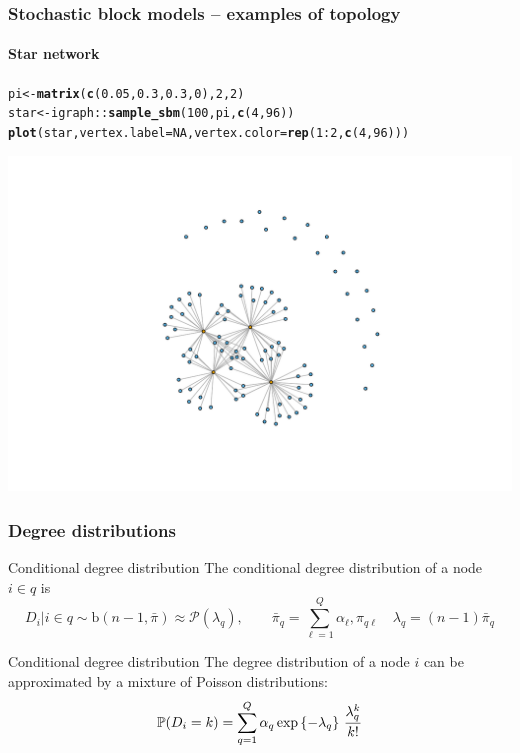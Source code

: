 \documentclass{beamer}\usepackage[]{graphicx}\usepackage[]{color}
\makeatletter
\newcommand{\hlnum}[1]{\textcolor[rgb]{0.686,0.059,0.569}{#1}}%
\newcommand{\hlopt}[1]{\textcolor[rgb]{0,0,0}{#1}}%
\newcommand{\hlstd}[1]{\textcolor[rgb]{0.345,0.345,0.345}{#1}}%
\newcommand{\hlkwb}[1]{\textcolor[rgb]{0.69,0.353,0.396}{#1}}%
\newcommand{\hlkwc}[1]{\textcolor[rgb]{0.333,0.667,0.333}{#1}}%
\newcommand{\hlkwd}[1]{\textcolor[rgb]{0.737,0.353,0.396}{\textbf{#1}}}%
\newenvironment{kframe}{%
 \def\at@end@of@kframe{}%
 \ifinner\ifhmode%
  \def\at@end@of@kframe{\end{minipage}}%
  \begin{minipage}{\columnwidth}%
 \fi\fi%
 \def\FrameCommand##1{\hskip\@totalleftmargin \hskip-\fboxsep
 \colorbox{shadecolor}{##1}\hskip-\fboxsep
     \hskip-\linewidth \hskip-\@totalleftmargin \hskip\columnwidth}%
 \MakeFramed {\advance\hsize-\width
   \@totalleftmargin\z@ \linewidth\hsize
   \@setminipage}}%
 {\par\unskip\endMakeFramed%
 \at@end@of@kframe}
\newenvironment{knitrout}{}{} %
\makeatother
\begin{document}
\begin{frame}[fragile]
  \frametitle{Stochastic block models -- examples of topology}
  \framesubtitle{Star network}

\begin{knitrout}\scriptsize
{}\color{fgcolor}\begin{kframe}
\begin{alltt}
\hlstd{pi} \hlkwb{<-} \hlkwd{matrix}\hlstd{(}\hlkwd{c}\hlstd{(}\hlnum{0.05}\hlstd{,}\hlnum{0.3}\hlstd{,}\hlnum{0.3}\hlstd{,}\hlnum{0}\hlstd{),}\hlnum{2}\hlstd{,}\hlnum{2}\hlstd{)}
\hlstd{star} \hlkwb{<-} \hlstd{igraph}\hlopt{::}\hlkwd{sample_sbm}\hlstd{(}\hlnum{100}\hlstd{, pi,} \hlkwd{c}\hlstd{(}\hlnum{4}\hlstd{,} \hlnum{96}\hlstd{))}
\hlkwd{plot}\hlstd{(star,} \hlkwc{vertex.label}\hlstd{=}\hlnum{NA}\hlstd{,} \hlkwc{vertex.color} \hlstd{=} \hlkwd{rep}\hlstd{(}\hlnum{1}\hlopt{:}\hlnum{2}\hlstd{,}\hlkwd{c}\hlstd{(}\hlnum{4}\hlstd{,}\hlnum{96}\hlstd{)))}
\end{alltt}
\end{kframe}
\includegraphics[width=.8\textwidth]{figures/unnamed-chunk-6-1} 

\end{knitrout}

\end{frame}

\begin{frame}
  \frametitle{Degree distributions}

  \begin{block}{Conditional degree distribution}
    The conditional degree distribution of a node $i\in q$ is
    \begin{equation*}
      D_i | i \in q \sim \mathrm{b}(n-1,\bar\pi) \approx \mathcal{P}(\lambda_q), \qquad \bar\pi_q = \sum_{\ell=1}^Q \alpha_\ell, \pi_{q\ell} \quad \lambda_q = (n-1)\bar\pi_q
    \end{equation*}
  \end{block}

  \vfill

  \begin{block}{Conditional degree distribution}
    The degree distribution of a node $i$ can be approximated by a mixture of Poisson distributions:
    \begin{equation*}
      \mathbb{P}(D_i = k) = \sum_{q=1}^Q\alpha_q \exp{\left\{-\lambda_q\right\}} \ \frac{\lambda_q^k}{k !}
    \end{equation*}
  \end{block}

\end{frame}
\end{document}
